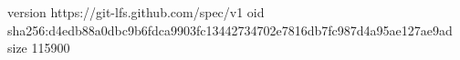 version https://git-lfs.github.com/spec/v1
oid sha256:d4edb88a0dbc9b6fdca9903fc13442734702e7816db7fc987d4a95ae127ae9ad
size 115900
